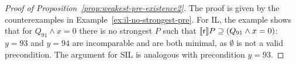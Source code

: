 \begin{proof}[Proof of Proposition~\ref{prop:weakest-pre-existence2}]
	The proof is given by the counterexamples in Example~\ref{ex:il-no-strongest-pre}.
	For IL, the example shows that for $Q_{91} \wedge x = 0$ there is no strongest $P$ such that $\llbracket\mathsf{r}\rrbracket P \supseteq (Q_{91} \wedge x = 0)$: $y = 93$ and $y = 94$ are incomparable and are both minimal, as $\emptyset$ is not a valid precondition.
	The argument for SIL is analogous with precondition $y = 93$.
\end{proof}
